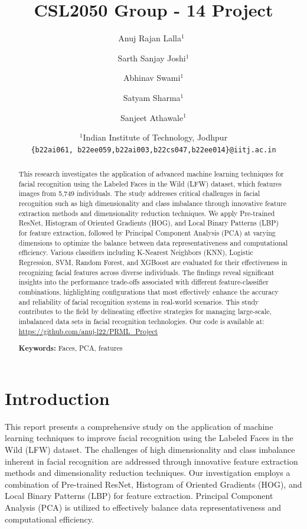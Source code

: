 \documentclass[a4paper]{article}
\title{CSL2050 Group - 14 Project}
\author{Anuj Rajan Lalla$^1$\ \and Sarth Sanjay Joshi$^1$ \and Abhinav Swami$^1$ \and Satyam Sharma$^1$ \and Sanjeet Athawale$^1$}
\date{
	$^1$Indian Institute of Technology, Jodhpur \\ \texttt{\{b22ai061, b22ee059,b22ai003,b22cs047,b22ee014\}@iitj.ac.in}
 }
\theoremstyle{plain}
\theoremstyle{definition}
\begin{document}
	\maketitle
	

\begin{abstract}
This research investigates the application of advanced machine learning techniques for facial recognition using the Labeled Faces in the Wild (LFW) dataset, which features images from 5,749 individuals. The study addresses critical challenges in facial recognition such as high dimensionality and class imbalance through innovative feature extraction methods and dimensionality reduction techniques. We apply Pre-trained ResNet, Histogram of Oriented Gradients (HOG), and Local Binary Patterns (LBP) for feature extraction, followed by Principal Component Analysis (PCA) at varying dimensions to optimize the balance between data representativeness and computational efficiency. Various classifiers including K-Nearest Neighbors (KNN), Logistic Regression, SVM, Random Forest, and XGBoost are evaluated for their effectiveness in recognizing facial features across diverse individuals. The findings reveal significant insights into the performance trade-offs associated with different feature-classifier combinations, highlighting configurations that most effectively enhance the accuracy and reliability of facial recognition systems in real-world scenarios. This study contributes to the field by delineating effective strategies for managing large-scale, imbalanced data sets in facial recognition technologies. Our code is available at: \url{https://github.com/anuj-l22/PRML_Project}

		\noindent\textbf{Keywords:} Faces, PCA, features
	\end{abstract}
 
\newpage
	\tableofcontents
	\newpage
	\section{Introduction}

This report presents a comprehensive study on the application of machine learning techniques to improve facial recognition using the Labeled Faces in the Wild (LFW) dataset. The challenges of high dimensionality and class imbalance inherent in facial recognition are addressed through innovative feature extraction methods and dimensionality reduction techniques. Our investigation employs a combination of Pre-trained ResNet, Histogram of Oriented Gradients (HOG), and Local Binary Patterns (LBP) for feature extraction. Principal Component Analysis (PCA) is utilized to effectively balance data representativeness and computational efficiency.
\end{document}
